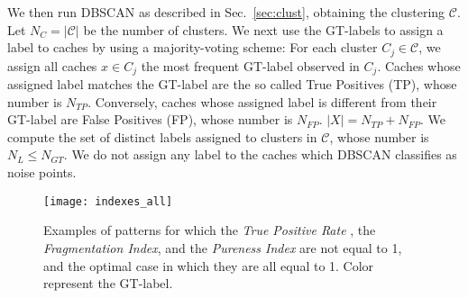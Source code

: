 \documentclass{acm_proc_article-sp}
\begin{document}
We then run DBSCAN as described in Sec.~\ref{sec:clust}, obtaining the clustering $\mathcal{C}$.
Let $N_C=|\mathcal{C}|$ be the number of clusters. We next use the GT-labels to assign a label
to caches by using a majority-voting scheme: For each cluster ${C}_j \in {\mathcal{C}}$, we assign all caches $x\in {C}_j$ the most frequent GT-label observed in ${C}_j$.
Caches whose assigned label matches the GT-label are the so called True Positives (TP), whose number is $N_{TP}$. Conversely, caches whose assigned label is different from their GT-label are False Positives (FP), whose number is $N_{FP}$. $|X|=N_{TP}+N_{FP}$.
We compute the set of distinct labels assigned to clusters in ${\mathcal{C}}$, whose number is $N_L\leq N_{GT}$.
We do not assign any label to the caches which DBSCAN classifies as noise points.



\begin{figure}[t!]
\begin{center}
 \texttt{[image: indexes\_all]}
 \caption{Examples of patterns for which the \textit{True Positive Rate} , the \textit{Fragmentation Index}, and the \textit{Pureness Index} are not equal to 1, and the optimal case in which they are all equal to 1. Color represent the GT-label.}
  \label{fig:indexes}
\end{center}
\end{figure}
\end{document}
